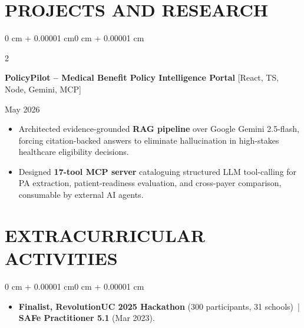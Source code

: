 \documentclass[10pt, letterpaper]{article}
\newenvironment{highlights}{
    \begin{itemize}[
        topsep=0.10 cm,
        parsep=0.06 cm,
        partopsep=0pt,
        itemsep=0.06 cm,
        leftmargin=12pt
    ]
}{
    \end{itemize}
}
\newenvironment{onecolentry}{
    \begin{adjustwidth}{0 cm + 0.00001 cm}{0 cm + 0.00001 cm}
}{
    \end{adjustwidth}
}
\newenvironment{twocolentry}[2][]{
    \onecolentry
    \def\secondColumn{#2}
    \setcolumnwidth{\fill, 4.5 cm}
    \begin{paracol}{2}
}{
    \switchcolumn \raggedleft \secondColumn
    \end{paracol}
    \endonecolentry
}
\begin{document}
\section{PROJECTS AND RESEARCH}
\begin{twocolentry}{May 2026}
\textbf{PolicyPilot -- Medical Benefit Policy Intelligence Portal} [React, TS, Node, Gemini, MCP]
\end{twocolentry}
\begin{highlights}
  \item Architected evidence-grounded \textbf{RAG pipeline} over Google Gemini 2.5-flash, forcing citation-backed answers to eliminate hallucination in high-stakes healthcare eligibility decisions.
  \item Designed \textbf{17-tool MCP server} cataloguing structured LLM tool-calling for PA extraction, patient-readiness evaluation, and cross-payer comparison, consumable by external AI agents.
\end{highlights}

\section{EXTRACURRICULAR ACTIVITIES}
\begin{onecolentry}
\begin{highlights}
  \item \textbf{Finalist, RevolutionUC 2025 Hackathon} (300 participants, 31 schools) \,|\, \textbf{SAFe Practitioner 5.1} (Mar 2023).
\end{highlights}
\end{onecolentry}
\end{document}
